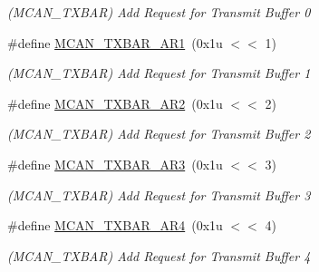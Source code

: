 \begin{DoxyCompactItemize}
\begin{DoxyCompactList}\small\item\em (M\+C\+A\+N\+\_\+\+T\+X\+B\+AR) Add Request for Transmit Buffer 0 \end{DoxyCompactList}\item 
\mbox{\label{group__SAME70__MCAN_ga7fedba40178069216312e7dd4a3f948e}} 
\#define \mbox{\hyperlink{group__SAME70__MCAN_ga7fedba40178069216312e7dd4a3f948e}{M\+C\+A\+N\+\_\+\+T\+X\+B\+A\+R\+\_\+\+A\+R1}}~(0x1u $<$$<$ 1)
\begin{DoxyCompactList}\small\item\em (M\+C\+A\+N\+\_\+\+T\+X\+B\+AR) Add Request for Transmit Buffer 1 \end{DoxyCompactList}\item 
\mbox{\label{group__SAME70__MCAN_gab5c052393df6c8020c0eaafe3866b8da}} 
\#define \mbox{\hyperlink{group__SAME70__MCAN_gab5c052393df6c8020c0eaafe3866b8da}{M\+C\+A\+N\+\_\+\+T\+X\+B\+A\+R\+\_\+\+A\+R2}}~(0x1u $<$$<$ 2)
\begin{DoxyCompactList}\small\item\em (M\+C\+A\+N\+\_\+\+T\+X\+B\+AR) Add Request for Transmit Buffer 2 \end{DoxyCompactList}\item 
\mbox{\label{group__SAME70__MCAN_gaf00a084f92823e440c36056b7e9fac1f}} 
\#define \mbox{\hyperlink{group__SAME70__MCAN_gaf00a084f92823e440c36056b7e9fac1f}{M\+C\+A\+N\+\_\+\+T\+X\+B\+A\+R\+\_\+\+A\+R3}}~(0x1u $<$$<$ 3)
\begin{DoxyCompactList}\small\item\em (M\+C\+A\+N\+\_\+\+T\+X\+B\+AR) Add Request for Transmit Buffer 3 \end{DoxyCompactList}\item 
\mbox{\label{group__SAME70__MCAN_gae9386708340ca11d7acd8e4b38930913}} 
\#define \mbox{\hyperlink{group__SAME70__MCAN_gae9386708340ca11d7acd8e4b38930913}{M\+C\+A\+N\+\_\+\+T\+X\+B\+A\+R\+\_\+\+A\+R4}}~(0x1u $<$$<$ 4)
\begin{DoxyCompactList}\small\item\em (M\+C\+A\+N\+\_\+\+T\+X\+B\+AR) Add Request for Transmit Buffer 4 \end{DoxyCompactList}\item 
\mbox{\label{group__SAME70__MCAN_gade80b4d15c74198f0c81d3430b7f9b9b}} 

\end{DoxyCompactItemize}
